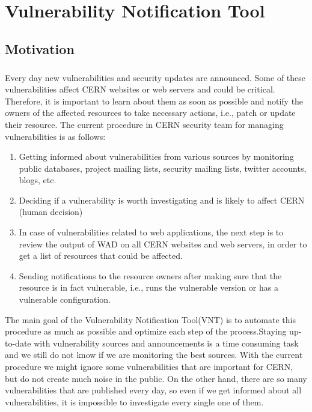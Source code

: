 \chapter{Vulnerability Notification Tool}
\label{vulnerability-notification-tool}
\thispagestyle{empty}

\section{Motivation}

\paragraph{}
Every day new vulnerabilities and security updates are announced. Some of these vulnerabilities affect CERN websites or web servers and could be critical. Therefore, it is important to learn about them as soon as possible and notify the owners of the affected resources to take necessary actions, i.e., patch or update their resource. The current procedure in CERN security team for managing vulnerabilities is as follows:
\begin{enumerate}
\item Getting informed about vulnerabilities from various sources by monitoring public databases, project mailing lists, security mailing lists, twitter accounts, blogs, etc.
\item Deciding if a vulnerability is worth investigating and is likely to affect CERN (human decision)
\item In case of vulnerabilities related to web applications, the next step is to review the output of WAD on all CERN websites and web servers, in order to get a list of resources that could be affected.
\item Sending notifications to the resource owners after making sure that the resource is in fact vulnerable, i.e., runs the vulnerable version or has a vulnerable configuration.
\end{enumerate}

The main goal of the Vulnerability Notification Tool(VNT) is to automate this procedure as much as possible and optimize each step of the process.Staying up-to-date with vulnerability sources and announcements is a time consuming task and we still do not know if we are monitoring the best sources. With the current procedure we might ignore some vulnerabilities that are important for CERN, but do not create much noise in the public. 
On the other hand, there are so many vulnerabilities that are published every day, so even if we get informed about all vulnerabilities, it is impossible to investigate every single one of them. 

